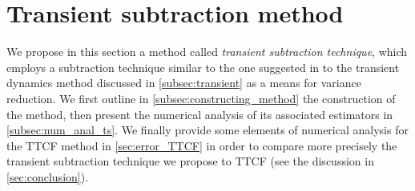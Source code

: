 \documentclass[11pt]{article}
\theoremstyle{definition}
\begin{document}
\section{Transient subtraction method}
\label{sec:transient}

We propose in this section a method called \emph{transient subtraction technique}, which employs a subtraction technique similar to the one suggested in \cite{ciccotti1975} to the transient dynamics method discussed in \cref{subsec:transient} as a means for variance reduction. We first outline in \cref{subsec:constructing_method} the construction of the method, then present the numerical analysis of its associated estimators in \cref{subsec:num_anal_ts}. We finally provide some elements of numerical analysis for the TTCF method in \cref{sec:error_TTCF} in order to compare more precisely the transient subtraction technique we propose to TTCF (see the discussion in \cref{sec:conclusion}).
\end{document}

